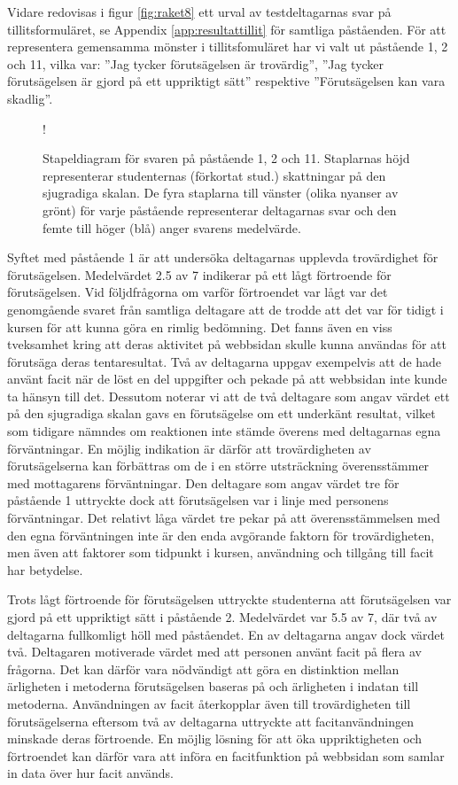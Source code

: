 Vidare redovisas i figur \ref{fig:raket8} ett urval av testdeltagarnas svar på tillitsformuläret, se Appendix \ref{app:resultattillit} för samtliga påståenden. För att representera gemensamma mönster i tillitsfomuläret har vi valt ut påstående 1, 2 och 11, vilka var: ''Jag tycker förutsägelsen är trovärdig'', ''Jag tycker förutsägelsen är gjord på ett uppriktigt sätt'' respektive ''Förutsägelsen kan vara skadlig''.
\begin{figure}[hbtp]
    \centering
    \hspace{-35px}
    \resizebox {\textwidth} {!} {
        
    }
    \caption{Stapeldiagram för svaren på påstående 1, 2 och 11. Staplarnas höjd representerar studenternas (förkortat stud.) skattningar på den sjugradiga skalan. De fyra staplarna till vänster (olika nyanser av grönt) för varje påstående representerar deltagarnas svar och den femte till höger (blå) anger svarens medelvärde.}
    \label{fig:raket9}
\end{figure}
Syftet med påstående 1 är att undersöka deltagarnas upplevda trovärdighet för förutsägelsen. Medelvärdet 2.5 av 7 indikerar på ett lågt förtroende för förutsägelsen. Vid följdfrågorna om varför förtroendet var lågt var det genomgående svaret från samtliga deltagare att de trodde att det var för tidigt i kursen för att kunna göra en rimlig bedömning. Det fanns även en viss tveksamhet kring att deras aktivitet på webbsidan skulle kunna användas för att förutsäga deras tentaresultat. Två av deltagarna uppgav exempelvis att de hade använt facit när de löst en del uppgifter och pekade på att webbsidan inte kunde ta hänsyn till det. Dessutom noterar vi att de två deltagare som angav värdet ett på den sjugradiga skalan gavs en förutsägelse om ett underkänt resultat, vilket som tidigare nämndes om reaktionen inte stämde överens med deltagarnas egna förväntningar. En möjlig indikation är därför att trovärdigheten av förutsägelserna kan förbättras om de i en större utsträckning överensstämmer med mottagarens förväntningar. Den deltagare som angav värdet tre för påstående 1 uttryckte dock att förutsägelsen var i linje med personens förväntningar. Det relativt låga värdet tre pekar på att överensstämmelsen med den egna förväntningen inte är den enda avgörande faktorn för trovärdigheten, men även att faktorer som tidpunkt i kursen, användning och tillgång till facit har betydelse.
 
Trots lågt förtroende för förutsägelsen uttryckte studenterna att förutsägelsen var gjord på ett uppriktigt sätt i påstående 2. Medelvärdet var 5.5 av 7, där två av deltagarna fullkomligt höll med påståendet. En av deltagarna angav dock värdet två. Deltagaren motiverade värdet med att personen använt facit på flera av frågorna. Det kan därför vara nödvändigt att göra en distinktion mellan ärligheten i metoderna förutsägelsen baseras på och ärligheten i indatan till metoderna. Användningen av facit återkopplar även till trovärdigheten till förutsägelserna eftersom två av deltagarna uttryckte att facitanvändningen minskade deras förtroende. En möjlig lösning för att öka uppriktigheten och förtroendet kan därför vara att införa en facitfunktion på webbsidan som samlar in data över hur facit används.

